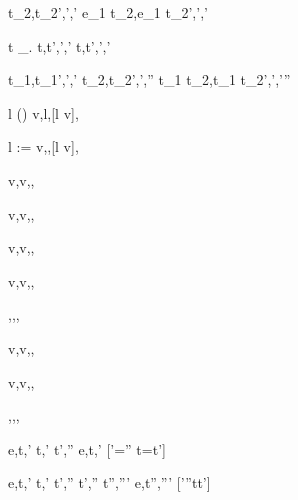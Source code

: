 
	{t_2,\sigma \normalise t_2',\sigma',\delta'}
	{e_1 \Trans t_2,\sigma \normalise e_1 \Trans t_2',\sigma',\delta'}

	{t \Step \lambda\_. \Forever t,\sigma \normalise t',\sigma',\delta'}
	{\Forever t,\sigma \normalise t',\sigma',\delta'}

	{t_1,\sigma \normalise t_1',\sigma',\delta' \Quad
	 t_2,\sigma \normalise t_2',\sigma',\delta''}
	{t_1 \Pair t_2,\sigma \normalise t_1 \Pair t_2',\sigma',\delta'\cup\delta''}




	{l \not\in {}(\sigma)}
	{\Share v,\sigma \normalise \Done l,[l \mapsto v]\sigma,\nothing}

	{}
	{l := v,\sigma \normalise \Done \Unit,[l \mapsto v]\sigma,}



  { }
  {\Done v,\sigma \normalise \Done v,\sigma,\nothing}

  { }
  {\Enter v,\sigma \normalise \Enter v,\sigma,\nothing}

  { }
  {\Update v,\sigma \normalise \Update v,\sigma,\nothing}

  { }
  {\View v,\sigma \normalise \View v,\sigma,\nothing}

  { }
  {\Pick {},\sigma \normalise \Pick {},\sigma,\nothing}

  { }
  {\Change v,\sigma \normalise \Change v,\sigma,\nothing}

  { }
  {\Watch v,\sigma \normalise \Watch v,\sigma,\nothing}

  { }
  {\Fail,\sigma \normalise \Fail,\sigma,\nothing}






    {e,\sigma \eval t,\sigma' \Quad
     t,\sigma' \stride t',\sigma''}
    {e,\sigma \normalise t,\sigma'}
    [\sigma'=\sigma'' \land t=t']

    {e,\sigma \eval t,\sigma'  \Quad
     t,\sigma' \stride t',\sigma''  \Quad
     t',\sigma'' \normalise t'',\sigma'''}
    {e,\sigma \normalise t'',\sigma'''}
    [\sigma'\neq \sigma''\vee t\neq t']



